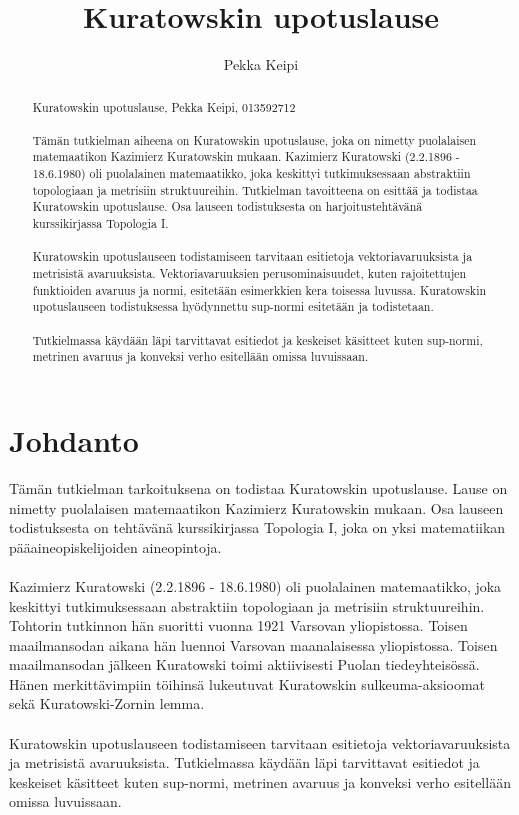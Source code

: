 \documentclass[12pt,a4paper,leqno]{report}
\title{Kuratowskin upotuslause}
\author{Pekka Keipi}
\theoremstyle{plain}
\theoremstyle{definition}
\theoremstyle{remark}
\begin{document}
\maketitle

\begin{abstract}
Kuratowskin upotuslause, Pekka Keipi, 013592712
\\
\\
Tämän tutkielman aiheena on Kuratowskin upotuslause, joka on nimetty puolalaisen matemaatikon Kazimierz Kuratowskin mukaan. Kazimierz Kuratowski (2.2.1896 - 18.6.1980) oli puolalainen matemaatikko, joka keskittyi tutkimuksessaan abstraktiin topologiaan ja metrisiin struktuureihin. Tutkielman tavoitteena on esittää ja todistaa Kuratowskin upotuslause. Osa lauseen todistuksesta on harjoitustehtävänä kurssikirjassa Topologia I.
\\
\\
Kuratowskin upotuslauseen todistamiseen tarvitaan esitietoja vektoriavaruuksista ja metrisistä avaruuksista. Vektoriavaruuksien perusominaisuudet, kuten rajoitettujen funktioiden avaruus ja normi, esitetään esimerkkien kera toisessa luvussa. Kuratowskin upotuslauseen todistuksessa hyödynnettu sup-normi esitetään ja todistetaan.
\\
\\
Tutkielmassa käydään läpi tarvittavat esitiedot ja keskeiset käsitteet kuten sup-normi, metrinen avaruus ja konveksi verho esitellään omissa luvuissaan.
\end{abstract}

\tableofcontents

\chapter{Johdanto}\label{johd}

Tämän tutkielman tarkoituksena on todistaa Kuratowskin upotuslause. Lause on nimetty puolalaisen matemaatikon Kazimierz Kuratowskin mukaan. Osa lauseen todistuksesta on tehtävänä kurssikirjassa Topologia I, joka on yksi matematiikan pääaineopiskelijoiden aineopintoja.
\\
\\
Kazimierz Kuratowski (2.2.1896 - 18.6.1980) oli puolalainen matemaatikko, joka keskittyi tutkimuksessaan abstraktiin topologiaan ja metrisiin struktuureihin. 
Tohtorin tutkinnon hän suoritti vuonna 1921 Varsovan yliopistossa. Toisen maailmansodan aikana hän luennoi Varsovan maanalaisessa yliopistossa. Toisen maailmansodan jälkeen Kuratowski toimi aktiivisesti Puolan tiedeyhteisössä.
Hänen merkittävimpiin töihinsä lukeutuvat Kuratowskin sulkeuma-aksioomat sekä Kuratowski-Zornin lemma.
\\
\\
Kuratowskin upotuslauseen todistamiseen tarvitaan esitietoja vektoriavaruuksista ja metrisistä avaruuksista. 
Tutkielmassa käydään läpi tarvittavat esitiedot ja keskeiset käsitteet kuten sup-normi, metrinen avaruus ja konveksi verho esitellään omissa luvuissaan.
\end{document}
